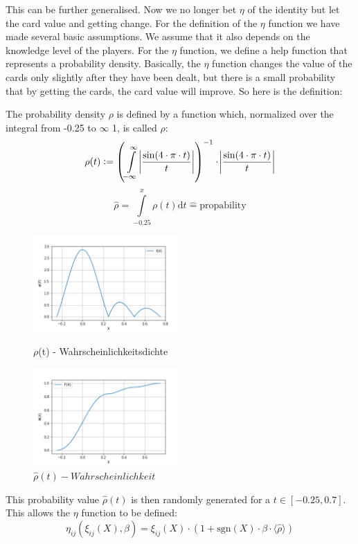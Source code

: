 This can be further generalised. Now we no longer bet $\eta$ of the identity but let the card value and getting change. For the definition of the $\eta$ function we have made several basic assumptions. We assume that it also depends on the knowledge level of the players. For the $\eta$ function, we define a help function that represents a probability density. Basically, the $\eta$ function changes the value of the cards only slightly after they have been dealt, but there is a small probability that by getting the cards, the card value will improve. So here is the definition:
\begin{definition}
The probability density $\rho$ is defined by a function which, normalized over the integral from -0.25 to $\infty$ 1, is called $\hat{\rho}$:
$$
\rho (t) := \left(\int\limits_{-\infty}^{\infty}\abs{\frac{\sin(4\cdot\pi\cdot t)}{t}}\right)^{-1}\cdot\abs{\frac{\sin(4\cdot\pi\cdot t)}{t}}
$$
$$
\widehat{\rho} = \int\limits_{-0.25}^{x}\rho (t)\mathrm{d} t\widehat{=}\mathrm{propability}
$$
\end{definition}
\begin{figure}[h]
    \centering
    \includegraphics[width=0.5\textwidth]{Bilder/b1_e}
    \caption{$\rho$(t) - Wahrscheinlichkeitsdichte}
    \label{fig:meine-grafik}
    \centering
    \includegraphics[width=0.5\textwidth]{Bilder/b1_f}
    \caption{$\widehat{\rho}(t) - Wahrscheinlichkeit$}
    \label{fig:meine-grafik}
\end{figure}
This probability value $\hat{\rho}(t)$ is then randomly generated for a $t\in [-0.25,0.7]$. This allows the $\eta$ function to be defined:
\begin{equation*}
\eta_{ij}(\xi_{ij}(X),\beta) = \xi_{ij}(X)\cdot(1+\mathrm{sgn}(X)\cdot\beta\cdot\langle\widehat{\rho}\rangle)
\end{equation*}
